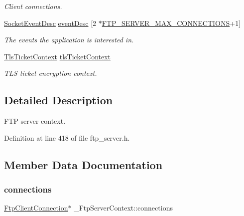 \begin{DoxyCompactItemize}
\begin{DoxyCompactList}\small\item\em Client connections. \end{DoxyCompactList}\item 
\hyperlink{structSocketEventDesc}{Socket\+Event\+Desc} \hyperlink{struct__FtpServerContext_a7cc60b8d3c7d189194126445a24a9582}{event\+Desc} \mbox{[}2 $\ast$\hyperlink{ftp__server_8h_af3d93e6b48588bd5702175cb67d65cf4}{F\+T\+P\+\_\+\+S\+E\+R\+V\+E\+R\+\_\+\+M\+A\+X\+\_\+\+C\+O\+N\+N\+E\+C\+T\+I\+O\+NS}+1\mbox{]}
\begin{DoxyCompactList}\small\item\em The events the application is interested in. \end{DoxyCompactList}\item 
\hyperlink{structTlsTicketContext}{Tls\+Ticket\+Context} \hyperlink{struct__FtpServerContext_abec43eaa55176ebb6a7e5113098e8598}{tls\+Ticket\+Context}
\begin{DoxyCompactList}\small\item\em T\+LS ticket encryption context. \end{DoxyCompactList}\end{DoxyCompactItemize}


\subsection{Detailed Description}
F\+TP server context. 

Definition at line 418 of file ftp\+\_\+server.\+h.



\subsection{Member Data Documentation}
\mbox{\label{struct__FtpServerContext_a66c28b1e81c44178f7c4067d61a8b22c}} 
\subsubsection{\texorpdfstring{connections}{connections}}
{\footnotesize\ttfamily \hyperlink{ftp__server_8h_ab682699c15473841571a42c3df57e9d2}{Ftp\+Client\+Connection}$\ast$ \+\_\+\+Ftp\+Server\+Context\+::connections}



